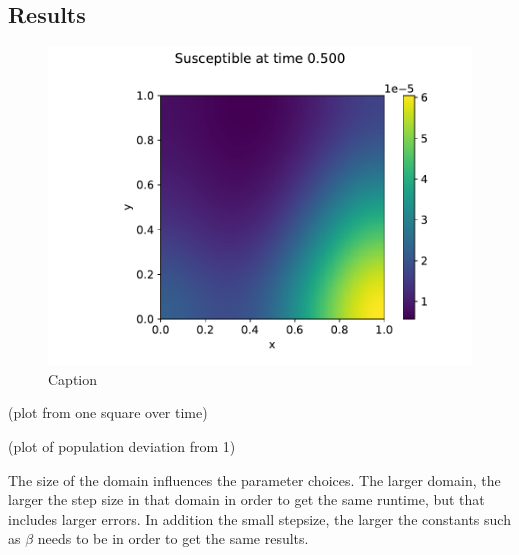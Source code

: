 \subsection{Results}
\begin{figure}
    \centering
    \includegraphics[width=\textwidth]{report/Images/plots/plot-i_t=5000-0.pdf}
    \caption{Caption}
    \label{fig:enter-label}
\end{figure}

(plot from one square over time)

(plot of population deviation from 1)

The size of the domain influences the parameter choices. The larger domain, the larger the step size in that domain in order to get the same runtime, but that includes larger errors.
In addition the small stepsize, the larger the constants such as $\beta$ needs to be in order to get the same results.


